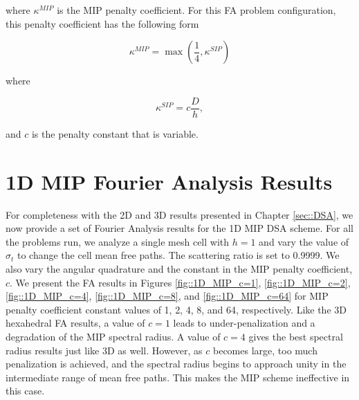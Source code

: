 \noindent where $\kappa^{MIP}$ is the MIP penalty coefficient. For this FA problem configuration, this penalty coefficient has the following form

\begin{equation}
\label{eq::App_DSA_MIP_penalty}
\kappa^{MIP} = \max (\frac{1}{4} , \kappa^{SIP})
\end{equation}

\noindent where

\begin{equation}
\label{eq::App_DSA_IP_penalty}
\kappa^{SIP} = c \frac{D}{h},
\end{equation}

\noindent and $c$ is the penalty constant that is variable.

\section{1D MIP Fourier Analysis Results}
\label{sec::App_DSA_resutls}

For completeness with the 2D and 3D results presented in Chapter \ref{sec::DSA}, we now provide a set of Fourier Analysis results for the 1D MIP DSA scheme. For all the problems run, we analyze a single mesh cell with $h=1$ and vary the value of $\sigma_t$ to change the cell mean free paths. The scattering ratio is set to 0.9999. We also vary the angular quadrature and the constant in the MIP penalty coefficient, $c$. We present the FA results in Figures \ref{fig::1D_MIP_c=1}, \ref{fig::1D_MIP_c=2}, \ref{fig::1D_MIP_c=4}, \ref{fig::1D_MIP_c=8}, and \ref{fig::1D_MIP_c=64} for MIP penalty coefficient constant values of 1, 2, 4, 8, and 64, respectively. Like the 3D hexahedral FA results, a value of $c=1$ leads to under-penalization and a degradation of the MIP spectral radius. A value of $c=4$ gives the best spectral radius results just like 3D as well. However, as $c$ becomes large, too much penalization is achieved, and the spectral radius begins to approach unity in the intermediate range of mean free paths. This makes the MIP scheme ineffective in this case.


